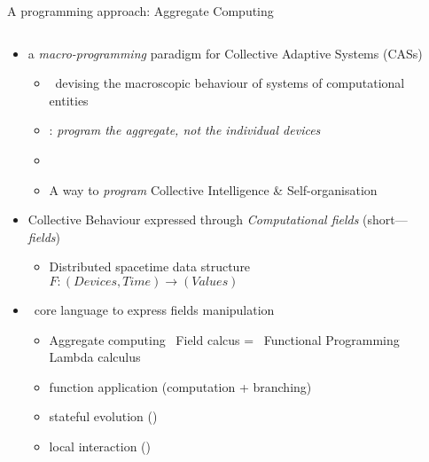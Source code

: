 \documentclass[8pt, aspectratio=169, handout]{beamer}
\begin{document}
\begin{frame}{A programming approach: Aggregate Computing~\cite{beal2015aggregate-programming}}
    \begin{columns}
      \begin{column}[c]{0.8\textwidth}
        \begin{card}[What?]
          \begin{itemize}
            \item[\success{\faInfo}] a \emph{macro-programming} paradigm for Collective Adaptive Systems (CASs)
            \begin{itemize}
              \item {} \faArrowRight \, devising the macroscopic behaviour of systems of computational entities
              \item {}: \emph{program the aggregate, not the individual devices}
              \item \item A way to \emph{program} Collective Intelligence \& Self-organisation 
            \end{itemize}
            \item[\success{\faInfo}] Collective Behaviour expressed through \emph{Computational fields} (short---\emph{fields})
            \begin{itemize}
              \item Distributed spacetime data structure \faArrowRight \, $F: (Devices, Time) \rightarrow (Values)$
            \end{itemize}
            \item[\success{\faInfo}]  \faArrowRight \, core language to express fields manipulation
            \begin{itemize}
              \item Aggregate computing \faArrowRight \, Field calcus = \, Functional Programming \faArrowRight \, Lambda calculus
              \item function application (computation + branching)
              \item stateful evolution ()
              \item local interaction ()
            \end{itemize}
          \end{itemize}
        \end{card}
      \end{column}
      \begin{column}[c]{0.2\textwidth}
      \end{column}
    \end{columns}
\end{frame}
\end{document}
